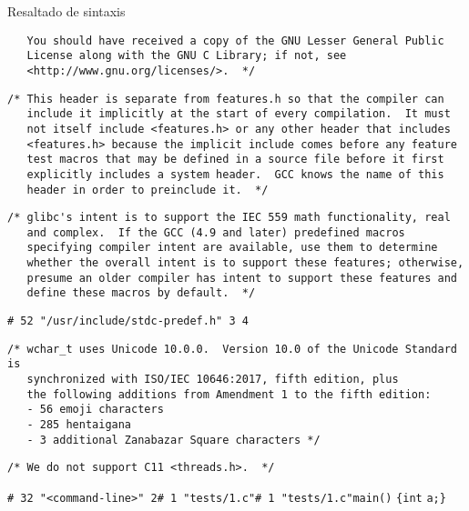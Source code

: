 \begin{frame}{Resaltado de sintaxis}
\begin{verbatim}
   You should have received a copy of the GNU Lesser General Public
   License along with the GNU C Library; if not, see
   <http://www.gnu.org/licenses/>.  */\end{verbatim}\leavevmode\newline\newline\newline\newline\newline\color{Gray}\begin{verbatim}/* This header is separate from features.h so that the compiler can
   include it implicitly at the start of every compilation.  It must
   not itself include <features.h> or any other header that includes
   <features.h> because the implicit include comes before any feature
   test macros that may be defined in a source file before it first
   explicitly includes a system header.  GCC knows the name of this
   header in order to preinclude it.  */\end{verbatim}\leavevmode\newline\newline\color{Gray}\begin{verbatim}/* glibc's intent is to support the IEC 559 math functionality, real
   and complex.  If the GCC (4.9 and later) predefined macros
   specifying compiler intent are available, use them to determine
   whether the overall intent is to support these features; otherwise,
   presume an older compiler has intent to support these features and
   define these macros by default.  */\end{verbatim}\leavevmode\newline\color{MidnightBlue}\verb$# 52 "/usr/include/stdc-predef.h" 3 4$\newline\color{Gray}\begin{verbatim}/* wchar_t uses Unicode 10.0.0.  Version 10.0 of the Unicode Standard is
   synchronized with ISO/IEC 10646:2017, fifth edition, plus
   the following additions from Amendment 1 to the fifth edition:
   - 56 emoji characters
   - 285 hentaigana
   - 3 additional Zanabazar Square characters */\end{verbatim}\leavevmode\newline\newline\newline\color{Gray}\begin{verbatim}/* We do not support C11 <threads.h>.  */\end{verbatim}\leavevmode\newline\color{MidnightBlue}\verb$# 32 "<command-line>" 2$\newline\color{MidnightBlue}\verb$# 1 "tests/1.c"$\newline\newline\color{MidnightBlue}\verb$# 1 "tests/1.c"$\newline\color{BlueViolet}\verb$main$\color{OliveGreen}\verb$($\color{OliveGreen}\verb$)$ \color{OliveGreen}\verb${$\newline    \color{Sepia}\verb$int$ \color{BlueViolet}\verb$a$\color{OliveGreen}\verb$;$\newline\color{OliveGreen}\verb$}$\newline
\end{frame}
